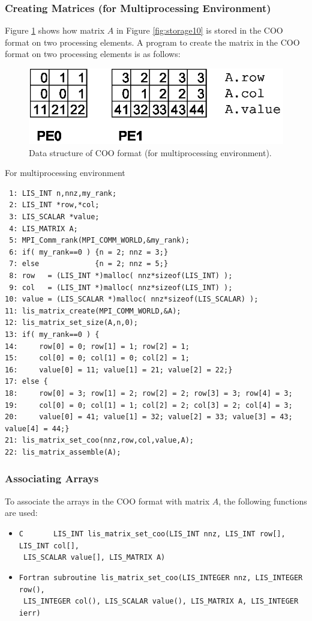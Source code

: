 \documentclass[a4paper]{article}
\begin{document}
\newpage
\subsubsection{Creating Matrices (for Multiprocessing Environment)}
Figure \ref{fig:storage10_mpi} shows how matrix $A$ in Figure
\ref{fig:storage10} is stored in the COO format on two processing
elements. A program to create the matrix in the COO format on two processing elements is as follows:
\begin{figure}[h]
{\centering 
\includegraphics{storage10_mpi.eps} 
\caption{Data structure of COO format (for multiprocessing environment).}\label{fig:storage10_mpi}}
\end{figure}
\begin{itemsquarebox}[l]{For multiprocessing environment}
\small
\begin{verbatim}
 1: LIS_INT n,nnz,my_rank;
 2: LIS_INT *row,*col;
 3: LIS_SCALAR *value;
 4: LIS_MATRIX A;
 5: MPI_Comm_rank(MPI_COMM_WORLD,&my_rank);
 6: if( my_rank==0 ) {n = 2; nnz = 3;}
 7: else             {n = 2; nnz = 5;}
 8: row   = (LIS_INT *)malloc( nnz*sizeof(LIS_INT) );
 9: col   = (LIS_INT *)malloc( nnz*sizeof(LIS_INT) );
10: value = (LIS_SCALAR *)malloc( nnz*sizeof(LIS_SCALAR) );
11: lis_matrix_create(MPI_COMM_WORLD,&A);
12: lis_matrix_set_size(A,n,0);
13: if( my_rank==0 ) {
14:     row[0] = 0; row[1] = 1; row[2] = 1;
15:     col[0] = 0; col[1] = 0; col[2] = 1;
16:     value[0] = 11; value[1] = 21; value[2] = 22;}
17: else {
18:     row[0] = 3; row[1] = 2; row[2] = 2; row[3] = 3; row[4] = 3;
19:     col[0] = 0; col[1] = 1; col[2] = 2; col[3] = 2; col[4] = 3;
20:     value[0] = 41; value[1] = 32; value[2] = 33; value[3] = 43; value[4] = 44;}
21: lis_matrix_set_coo(nnz,row,col,value,A);
22: lis_matrix_assemble(A);
\end{verbatim}
\end{itemsquarebox}

\subsubsection{Associating Arrays}
To associate the arrays in the COO format with matrix $A$, the following functions are used:
\begin{itemize}
\item \verb|C       LIS_INT lis_matrix_set_coo(LIS_INT nnz, LIS_INT row[], LIS_INT col[],|\\
      \verb| LIS_SCALAR value[], LIS_MATRIX A)|
\item \verb|Fortran subroutine lis_matrix_set_coo(LIS_INTEGER nnz, LIS_INTEGER row(),|\\
      \verb| LIS_INTEGER col(), LIS_SCALAR value(), LIS_MATRIX A, LIS_INTEGER ierr)|
\end{itemize}
\end{document}
